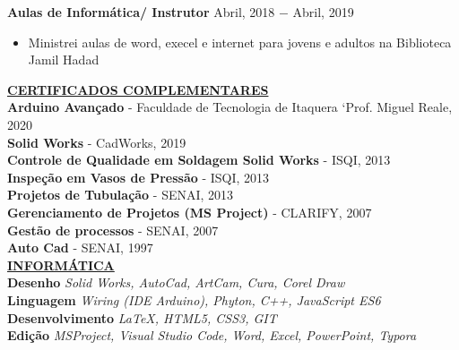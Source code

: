 \documentclass{article}
\begin{document}
\noindent \textbf{Aulas de Informática/ Instrutor} \hfill Abril, 2018 $-$ Abril, 2019
\begin{itemize}[noitemsep,nolistsep,leftmargin=*]
\item {Ministrei aulas de word, execel e internet para jovens e adultos na Biblioteca Jamil Hadad \\}
\end{itemize}

\noindent \textbf{\underline{CERTIFICADOS COMPLEMENTARES}} \\
\noindent \textbf{Arduino Avançado} - Faculdade de Tecnologia de Itaquera ‘Prof.
Miguel Reale, 2020\\
\noindent \textbf{Solid Works} - CadWorks, 2019\\
\noindent \textbf{Controle de Qualidade em Soldagem Solid Works} - ISQI, 2013\\
\noindent \textbf{Inspeção em Vasos de Pressão} - ISQI, 2013\\
\noindent \textbf{Projetos de Tubulação} - SENAI, 2013\\
\noindent \textbf{Gerenciamento de Projetos (MS Project)} - CLARIFY, 2007\\
\noindent \textbf{Gestão de processos} - SENAI, 2007\\
\noindent \textbf{Auto Cad} - SENAI, 1997\\

\noindent \textbf{\underline{INFORMÁTICA}} \\
\noindent \textbf{Desenho} \textit {Solid Works, AutoCad, ArtCam, Cura, Corel Draw} \\
\noindent \textbf{Linguagem} \textit {Wiring (IDE Arduino), Phyton, C++, JavaScript ES6} \\
\noindent \textbf{Desenvolvimento} \textit {LaTeX, HTML5, CSS3, GIT} \\
\noindent \textbf{Edição} \textit {MSProject, Visual Studio Code, Word, Excel, PowerPoint, Typora}\\
\end{document}
